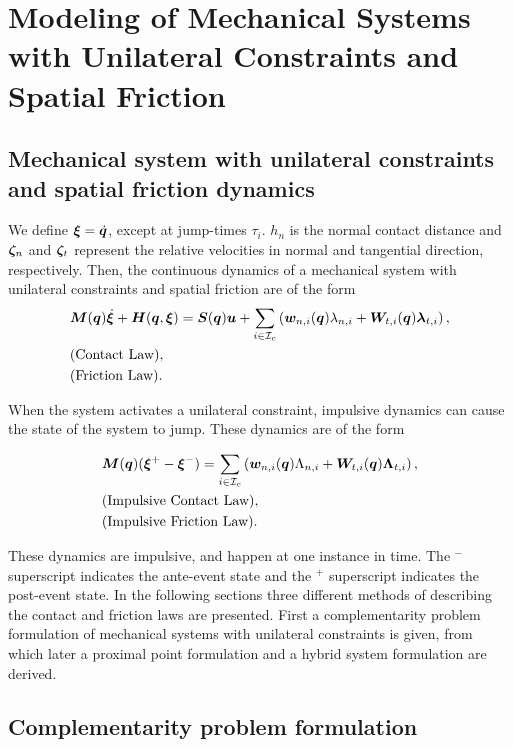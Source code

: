 \documentclass[DC2017114Bouma.tex]{subfiles}
\begin{document}
\graphicspath{{02_Material/img/}}


\cleartooddpage
\chapter{Modeling of Mechanical Systems with Unilateral Constraints and Spatial Friction}
\section{Mechanical system with unilateral constraints and spatial friction dynamics}
We define $\boldsymbol{\xi}=\dot{{\boldsymbol{q}}}$, except at jump-times $\tau_i$. $h_n$ is the normal contact distance and $\boldsymbol{\zeta}_{n}$ and $\boldsymbol{\zeta}_{t}$ represent the relative velocities in normal and tangential direction,  respectively. Then, the continuous dynamics of a mechanical system with unilateral constraints and spatial friction are of the form
\begin{align}
&{\boldsymbol{M}}({\boldsymbol{q}})\dot{\boldsymbol{\xi}} + {\boldsymbol{H}}({\boldsymbol{q}},\boldsymbol{\xi}) = {\boldsymbol{S}}({\boldsymbol{q}}){\boldsymbol{u}} + \sum_{i\in\mathcal{I}_c}\left({\boldsymbol{w}}_{n,i}({\boldsymbol{q}})\lambda_{n,i} + {\boldsymbol{W}}_{t,i}({\boldsymbol{q}})\boldsymbol{\lambda}_{t,i} \right), \label{eq:appcont1}\\
&\text{(Contact Law)},\label{eq:appcont2}\\
&\text{(Friction Law)}.\label{eq:appcont3}
\end{align}

When the system activates a unilateral constraint, impulsive dynamics can cause the state of the system to jump. These dynamics are of the form

\begin{align}
&{\boldsymbol{M}}({\boldsymbol{q}})(\boldsymbol{\xi}^+ - \boldsymbol{\xi}^-) = \sum_{i\in\mathcal{I}_c}\left( {\boldsymbol{w}}_{n,i}({\boldsymbol{q}})\Lambda_{n,i} + {\boldsymbol{W}}_{t,i}({\boldsymbol{q}})\boldsymbol{\Lambda}_{t,i}\right), \label{eq:appimp1}\\
&\text{(Impulsive Contact Law)},\label{eq:appimp2}\\
&\text{(Impulsive Friction Law)}.\label{eq:appimp3}
\end{align}

These dynamics are impulsive, and happen at one instance in time. The $^-$ superscript indicates the ante-event state and the $^+$ superscript indicates the post-event state. In the following sections three different methods of describing the contact and friction laws are presented. First a complementarity problem formulation of mechanical systems with unilateral constraints is given, from which later a proximal point formulation and a hybrid system formulation are derived.

\section{Complementarity problem formulation}\label{sec:comp}
\end{document}
